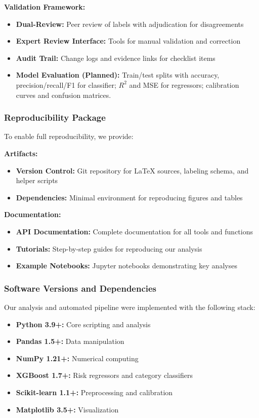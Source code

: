 \textbf{Validation Framework:}
\begin{itemize}
    \item \textbf{Dual-Review:} Peer review of labels with adjudication for disagreements
    \item \textbf{Expert Review Interface:} Tools for manual validation and correction
    \item \textbf{Audit Trail:} Change logs and evidence links for checklist items
    \item \textbf{Model Evaluation (Planned):} Train/test splits with accuracy, precision/recall/F1 for classifier; $R^2$ and MSE for regressors; calibration curves and confusion matrices.
\end{itemize}

\subsubsection{Reproducibility Package}
To enable full reproducibility, we provide:

\textbf{Artifacts:}
\begin{itemize}
    \item \textbf{Version Control:} Git repository for LaTeX sources, labeling schema, and helper scripts
    \item \textbf{Dependencies:} Minimal environment for reproducing figures and tables
\end{itemize}

\textbf{Documentation:}
\begin{itemize}
    \item \textbf{API Documentation:} Complete documentation for all tools and functions
    \item \textbf{Tutorials:} Step-by-step guides for reproducing our analysis
    \item \textbf{Example Notebooks:} Jupyter notebooks demonstrating key analyses
\end{itemize}

\subsubsection{Software Versions and Dependencies}
Our analysis and automated pipeline were implemented with the following stack:
\begin{itemize}
    \item \textbf{Python 3.9+:} Core scripting and analysis
    \item \textbf{Pandas 1.5+:} Data manipulation
    \item \textbf{NumPy 1.21+:} Numerical computing
    \item \textbf{XGBoost 1.7+:} Risk regressors and category classifiers
    \item \textbf{Scikit-learn 1.1+:} Preprocessing and calibration
    \item \textbf{Matplotlib 3.5+:} Visualization
\end{itemize}

